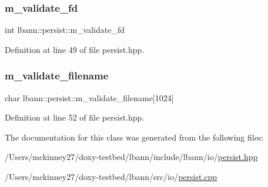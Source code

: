 \mbox{\label{classlbann_1_1persist_a87927d03b0cf684023178f997c038783}} 
\subsubsection{\texorpdfstring{m\+\_\+validate\+\_\+fd}{m\_validate\_fd}}
{\footnotesize\ttfamily int lbann\+::persist\+::m\+\_\+validate\+\_\+fd\hspace{0.3cm}{\ttfamily [protected]}}



Definition at line 49 of file persist.\+hpp.

\mbox{\label{classlbann_1_1persist_a8ccf3728c62f825ec2f8cfe15929fc2a}} 
\subsubsection{\texorpdfstring{m\+\_\+validate\+\_\+filename}{m\_validate\_filename}}
{\footnotesize\ttfamily char lbann\+::persist\+::m\+\_\+validate\+\_\+filename\mbox{[}1024\mbox{]}\hspace{0.3cm}{\ttfamily [protected]}}



Definition at line 52 of file persist.\+hpp.



The documentation for this class was generated from the following files\+:\begin{DoxyCompactItemize}
\item 
/\+Users/mckinney27/doxy-\/testbed/lbann/include/lbann/io/\hyperlink{persist_8hpp}{persist.\+hpp}\item 
/\+Users/mckinney27/doxy-\/testbed/lbann/src/io/\hyperlink{persist_8cpp}{persist.\+cpp}\end{DoxyCompactItemize}

